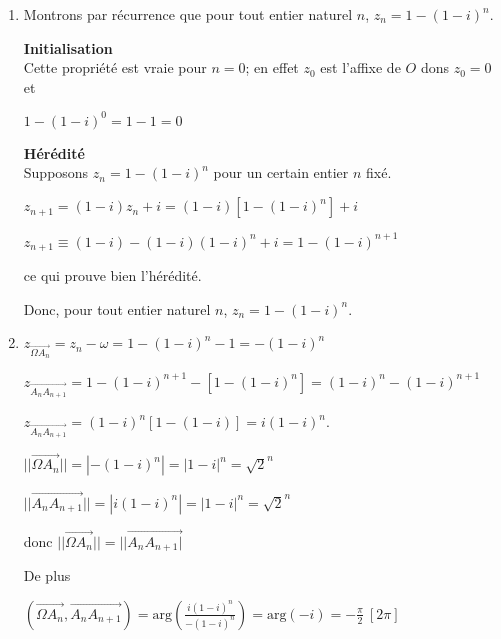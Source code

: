 \begin{corrige}
\begin{enumerate}
          \begin{enumerate}[label=\alph*.]
               \item
               Montrons par récurrence que pour tout entier naturel $n$, $z_{n}=1-\left(1-i\right)^{n}$.
\par
               \textbf{Initialisation}
\\
               Cette propriété est vraie pour $n=0$; en effet $z_{0}$ est l'affixe de $O$ dons $z_{0}=0$ et
               \par
               $1-\left(1-i\right)^{0}=1-1=0$
\par
               \textbf{Hérédité}
\\
               Supposons $z_{n}=1-\left(1-i\right)^{n}$ pour un certain entier $n$ fixé.
               \par
               $z_{n+1}=\left(1-i\right)z_{n}+i=\left(1-i\right)\left[1-\left(1-i\right)^{n}\right]+i$
               \par
               $z_{n+1}\equiv \left(1-i\right)-\left(1-i\right)\left(1-i\right)^{n}+i=1-\left(1-i\right)^{n+1}$
               \par
               ce qui prouve bien l'hérédité.
               \par
               Donc, pour tout entier naturel $n$, $z_{n}=1-\left(1-i\right)^{n}$.
               \item
               $z_{\overrightarrow{\Omega  A_{n}}}=z_{n}-\omega =1-\left(1-i\right)^{n}-1=-\left(1-i\right)^{n}$
               \par
               $z_{\overrightarrow{A_{n}A_{n+1}}}=1-\left(1-i\right)^{n+1}-\left[1-\left(1-i\right)^{n}\right]=\left(1-i\right)^{n}-\left(1-i\right)^{n+1}$
               \par
               $z_{\overrightarrow{A_{n}A_{n+1}}}=\left(1-i\right)^{n}\left[1-\left(1-i\right)\right]=i\left(1-i\right)^{n}$.
               \par
               $||\overrightarrow{\Omega  A_{n}}||=|-\left(1-i\right)^{n}|=|1-i|^{n}=\sqrt{2}^{n}$
               \par
               $||\overrightarrow{A_{n}A_{n+1}}||=|i\left(1-i\right)^{n}|=|1-i|^{n}=\sqrt{2}^{n}$
               \par
               donc $||\overrightarrow{\Omega  A_{n}}||=||\overrightarrow{A_{n}A_{n+1}|}$
               \par
               De plus
               \par
               $\left(\overrightarrow{\Omega  A_{n}}, \overrightarrow{A_{n}A_{n+1}}\right)=\text{arg}\left(\frac{i\left(1-i\right)^{n}}{-\left(1-i\right)^{n}}\right)=\text{arg}\left(-i\right)=-\frac{\pi }{2}\ \left[2\pi \right]$

\end{enumerate}
\end{enumerate}
\end{corrige}

